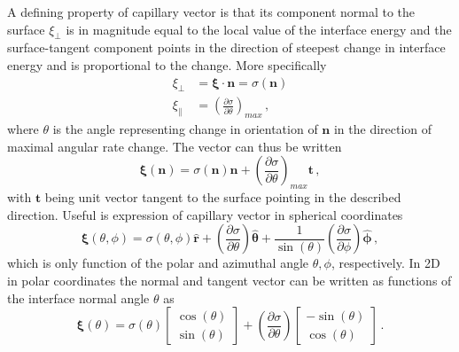 A defining property of capillary vector is that its component normal to the surface $\xi_\perp$ is in magnitude equal to the local value of the interface energy and the surface-tangent component points in the direction of steepest change in interface energy and is proportional to the change. More specifically  
\begin{align}
    \xi_\perp &= \bm{\xi}\cdot\bm{n}=\sigma(\bm{n}) \\
    \xi_\| &= \left(\frac{\partial \sigma}{\partial \theta}\right)_{max} \,,
\end{align}
where $\theta$ is the angle representing change in orientation of $\bm{n}$ in the direction of maximal angular rate change. The vector can thus be written
\begin{equation}
    \bm{\xi}(\bm{n}) = \sigma(\bm{n})\bm{n} + \left(\frac{\partial \sigma}{\partial \theta}\right)_{max} \bm{t} \,,
\end{equation}
with $\bm{t}$ being unit vector tangent to the surface pointing in the described direction. Useful is expression of capillary vector in spherical coordinates 
\begin{equation}
    \bm{\xi}(\theta,\phi) = \sigma(\theta,\phi)\bm{\hat{r}} + \left(\frac{\partial \sigma}{\partial \theta}\right)\bm{\hat{\theta}} + \frac{1}{\sin(\theta)}\left(\frac{\partial \sigma}{\partial \phi}\right)\bm{\hat{\phi}} \,,
\end{equation}
which is only function of the polar and azimuthal angle $\theta,\phi$, respectively. In 2D in polar coordinates the normal and tangent vector can be written as functions of the interface normal angle $\theta$ as
\begin{equation} \label{eq_xivec_2D}
    \bm{\xi}(\theta) = \sigma(\theta)\begin{bmatrix}
          \cos(\theta)  \\
          \sin(\theta) 
     \end{bmatrix} + \left(\frac{\partial \sigma}{\partial \theta}\right)\begin{bmatrix}
          -\sin(\theta) \\
          \cos(\theta)  
     \end{bmatrix} \,.
\end{equation}

